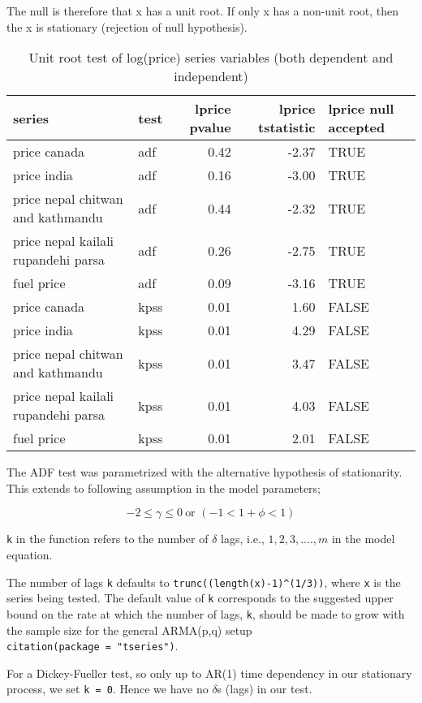 \documentclass[
  12pt,
]{article}
\begin{document}
The null is therefore that x has a unit root. If only x has a non-unit root, then the x is stationary (rejection of null hypothesis).

\begin{table}

\caption{\label{tab:adf-kpss-test-retail}Unit root test of log(price) series variables (both dependent and independent)}
\centering
\begin{tabular}[t]{>{\raggedright\arraybackslash}p{8em}lrrl}
\toprule
series & test & lprice pvalue & lprice tstatistic & lprice null accepted\\
\midrule
price canada & adf & 0.42 & -2.37 & TRUE\\
price india & adf & 0.16 & -3.00 & TRUE\\
price nepal chitwan and kathmandu & adf & 0.44 & -2.32 & TRUE\\
price nepal kailali rupandehi parsa & adf & 0.26 & -2.75 & TRUE\\
fuel price & adf & 0.09 & -3.16 & TRUE\\
\addlinespace
price canada & kpss & 0.01 & 1.60 & FALSE\\
price india & kpss & 0.01 & 4.29 & FALSE\\
price nepal chitwan and kathmandu & kpss & 0.01 & 3.47 & FALSE\\
price nepal kailali rupandehi parsa & kpss & 0.01 & 4.03 & FALSE\\
fuel price & kpss & 0.01 & 2.01 & FALSE\\
\bottomrule
\end{tabular}
\end{table}

The ADF test was parametrized with the alternative hypothesis of stationarity. This extends to following assumption in the model parameters;

\[
-2 \leq \gamma \leq 0\ \text{or } (-1 < 1+\phi < 1)
\]

\texttt{k} in the function refers to the number of \(\delta\) lags, i.e., \(1, 2, 3, ...., m\) in the model equation.

The number of lags \texttt{k} defaults to \texttt{trunc((length(x)-1)\^{}(1/3))}, where \texttt{x} is the series being tested. The default value of \texttt{k} corresponds to the suggested upper bound on the rate at which the number of lags, \texttt{k}, should be made to grow with the sample size for the general ARMA(p,q) setup \texttt{citation(package\ =\ "tseries")}.

For a Dickey-Fueller test, so only up to AR(1) time dependency in our stationary process, we set \texttt{k\ =\ 0}. Hence we have no \(\delta\)s (lags) in our test.
\end{document}
